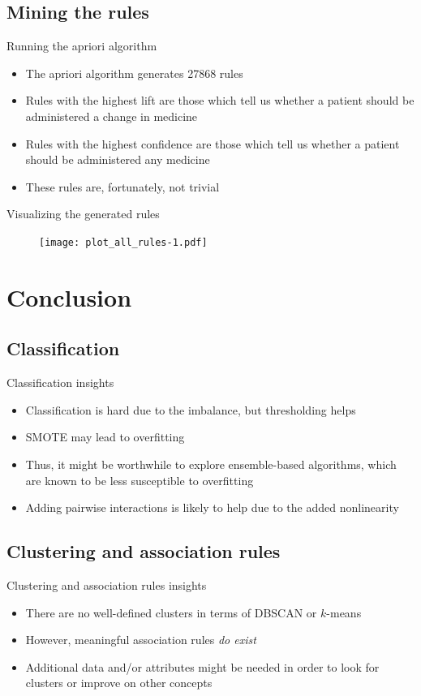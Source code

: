 \documentclass[serif, hyperref={unicode}, xcolor={x11names, psnames, dvipsnames,
  table}, usepdftitle=false]{beamer}
\begin{document}
\subsection{Mining the rules}
\begin{frame}{Running the apriori algorithm}
  \begin{itemize}
  \item The apriori algorithm generates \num{27868} rules
  \item Rules with the highest lift are those which tell us whether a patient
    should be administered a change in medicine
  \item Rules with the highest confidence are those which tell us whether a
    patient should be administered any medicine
  \item These rules are, fortunately, not trivial
  \end{itemize}
\end{frame}

\begin{frame}{Visualizing the generated rules}
  \begin{figure}[!h]
    \texttt{[image: plot\_all\_rules-1.pdf]}
  \end{figure}
\end{frame}

\section{Conclusion}

\subsection{Classification}
\begin{frame}{Classification insights}
  \begin{itemize}
  \item Classification is hard due to the imbalance, but thresholding helps
  \item SMOTE may lead to overfitting
  \item Thus, it might be worthwhile to explore ensemble-based algorithms, which
    are known to be less susceptible to overfitting
  \item Adding pairwise interactions is likely to help due to the added
    nonlinearity
  \end{itemize}
\end{frame}

\subsection{Clustering and association rules}
\begin{frame}{Clustering and association rules insights}
  \begin{itemize}
  \item There are no well-defined clusters in terms of DBSCAN or $k$-means
  \item However, meaningful association rules \emph{do exist}
  \item Additional data and/or attributes might be needed in order to look for
    clusters or improve on other concepts
  \end{itemize}
\end{frame}
\end{document}
